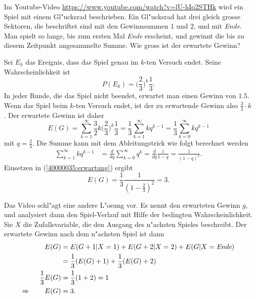 Im Youtube-Video
\url{https://www.youtube.com/watch?v=lU-hIq2STHk}
wird ein Spiel mit einem Gl"ucksrad beschrieben.
Ein Gl"ucksrad hat drei gleich grosse Sektoren, die beschriftet sind mit
den Gewinnsummen $1$ und $2$, und mit {\em Ende}.
Man spielt so lange, bis zum ersten Mal {\em Ende} erscheint, und gewinnt 
die bis zu diesem Zeitpunkt angesammelte Summe.
Wie gross ist der erwartete Gewinn?

\begin{loesung}
Sei $E_k$ das Ereignis, dass das Spiel genau im $k$-ten Versuch endet.
Seine Wahrscheinlichkeit ist
\[
P(E_k)=\biggl(\frac23\biggr)^k\frac13.
\]
In jeder Runde, die das Spiel nicht beendet, erwartet man einen Gewinn von $1.5$.
Wenn das Spiel beim $k$-ten Versuch endet, ist der zu erwartende Gewinn also
$\frac32\cdot k$.
Der erwartete Gewinn ist daher
\begin{equation}
E(G)
=
\sum_{k=1}^\infty \frac32k\biggl(\frac23\biggr)^k\frac13
=
\frac13\sum_{k=1}^\infty kq^{k-1}
=
\frac13\sum_{k=0}^\infty kq^{k-1}
\label{40000035:erwartung}
\end{equation}
mit $q=\frac23$.
Die Summe kann mit dem Ableitungstrick wie folgt berechnet werden
\begin{align*}
\sum_{k=1}^\infty kq^{k-1}
&=
\frac{d}{dq} \sum_{k=0}^\infty q^k
=
\frac{d}{dq} \frac{1}{1-q}
=
\frac1{(1-q)^2}.
\end{align*}
Einsetzen in (\ref{40000035:erwartung}) ergibt
\[
E(G)=\frac13\frac1{(1-\frac23)^2}=3.
\]

Das Video schl"agt eine andere L"osung vor.  
Es nennt den erwarteten Gewinn $g$, und analysiert dann den Spiel-Verlauf mit
Hilfe der bedingten Wahrscheinlichkeit.
Sie $X$ die Zufallsvariable, die den Ausgang des n"achsten Spieles beschreibt.
Der erwartete Gewinn nach dem n"achsten Spiel ist dann
\begin{align*}
E(G)
&=
E(G+1|X=1)+E(G+2|X=2)+E(G|X=\text{\em Ende})
\\
&=
\frac13(E(G)+1) + \frac13(E(G)+2)
\\
\frac13E(G)
&=\frac13(1+2)=1
\\
\Rightarrow\qquad E(G)&=3.
\end{align*}
\end{loesung}

